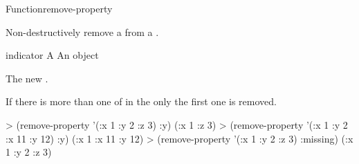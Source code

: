 \documentclass[10pt,twoside,english,pdftex]{article}
\begin{document}

\begin{functiondoc}{Function}{remove-property}{ 
  \returns{} } 
%
%
  
\fnsyntax

\fnpurpose Non-destructively remove a  from a
. 

\fnpackage {}

\fnmodule {}

\fnargs
\begin{args}{indicator}
\arg[plist] A 
\arg[indicator] An object
\end{args}

\fnreturns The new . 

\fndescription If there is more than one  of
 in the  only the first one is
removed.

\fnexamples
%
\W\supp
\begin{example}
> (remove-property '(:x 1 :y 2 :z 3) :y)
(:x 1 :z 3)
> (remove-property '(:x 1 :y 2 :x 11 :y 12) :y)
(:x 1 :x 11 :y 12)
> (remove-property '(:x 1 :y 2 :z 3) :missing)
(:x 1 :y 2 :z 3)
\end{example}

\end{functiondoc}

\end{document}
